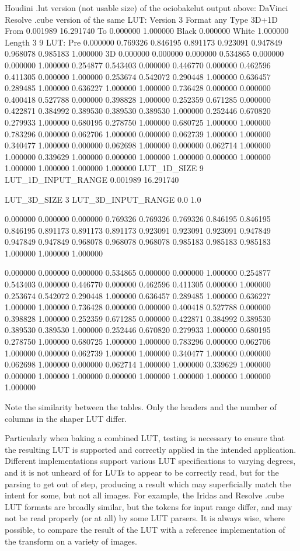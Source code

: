Houdini .lut version (not usable size) of the ociobakelut output above:
DaVinci Resolve .cube version of the same LUT:
Version		3
Format		any
Type		3D+1D
From		0.001989 16.291740
To		0.000000 1.000000
Black		0.000000
White		1.000000
Length		3 9
LUT:
Pre {
	0.000000
	0.769326
	0.846195
	0.891173
	0.923091
	0.947849
	0.968078
	0.985183
	1.000000
}
3D {
	0.000000 0.000000 0.000000
	0.534865 0.000000 0.000000
	1.000000 0.254877 0.543403
	0.000000 0.446770 0.000000
	0.462596 0.411305 0.000000
	1.000000 0.253674 0.542072
	0.290448 1.000000 0.636457
	0.289485 1.000000 0.636227
	1.000000 1.000000 0.736428
	0.000000 0.000000 0.400418
	0.527788 0.000000 0.398828
	1.000000 0.252359 0.671285
	0.000000 0.422871 0.384992
	0.389530 0.389530 0.389530
	1.000000 0.252446 0.670820
	0.279933 1.000000 0.680195
	0.278750 1.000000 0.680725
	1.000000 1.000000 0.783296
	0.000000 0.062706 1.000000
	0.000000 0.062739 1.000000
	1.000000 0.340477 1.000000
	0.000000 0.062698 1.000000
	0.000000 0.062714 1.000000
	1.000000 0.339629 1.000000
	0.000000 1.000000 1.000000
	0.000000 1.000000 1.000000
	1.000000 1.000000 1.000000
 }
LUT_1D_SIZE 9
LUT_1D_INPUT_RANGE 0.001989 16.291740

LUT_3D_SIZE 3
LUT_3D_INPUT_RANGE 0.0 1.0

0.000000 0.000000 0.000000
0.769326 0.769326 0.769326
0.846195 0.846195 0.846195
0.891173 0.891173 0.891173
0.923091 0.923091 0.923091
0.947849 0.947849 0.947849
0.968078 0.968078 0.968078
0.985183 0.985183 0.985183
1.000000 1.000000 1.000000

0.000000 0.000000 0.000000
0.534865 0.000000 0.000000
1.000000 0.254877 0.543403
0.000000 0.446770 0.000000
0.462596 0.411305 0.000000
1.000000 0.253674 0.542072
0.290448 1.000000 0.636457
0.289485 1.000000 0.636227
1.000000 1.000000 0.736428
0.000000 0.000000 0.400418
0.527788 0.000000 0.398828
1.000000 0.252359 0.671285
0.000000 0.422871 0.384992
0.389530 0.389530 0.389530
1.000000 0.252446 0.670820
0.279933 1.000000 0.680195
0.278750 1.000000 0.680725
1.000000 1.000000 0.783296
0.000000 0.062706 1.000000
0.000000 0.062739 1.000000
1.000000 0.340477 1.000000
0.000000 0.062698 1.000000
0.000000 0.062714 1.000000
1.000000 0.339629 1.000000
0.000000 1.000000 1.000000
0.000000 1.000000 1.000000
1.000000 1.000000 1.000000

Note the similarity between the tables. Only the headers and the number of columns in the shaper LUT differ.

Particularly when baking a combined LUT, testing is necessary to ensure that the resulting LUT is supported and correctly applied in the intended application. Different implementations support various LUT specifications to varying degrees, and it is not unheard of for LUTs to appear to be correctly read, but for the parsing to get out of step, producing a result which may superficially match the intent for some, but not all images. For example, the Iridas and Resolve .cube LUT formats are broadly similar, but the tokens for input range differ, and may not be read properly (or at all) by some LUT parsers. It is always wise, where possible, to compare the result of the LUT with a reference implementation of the transform on a variety of images.

